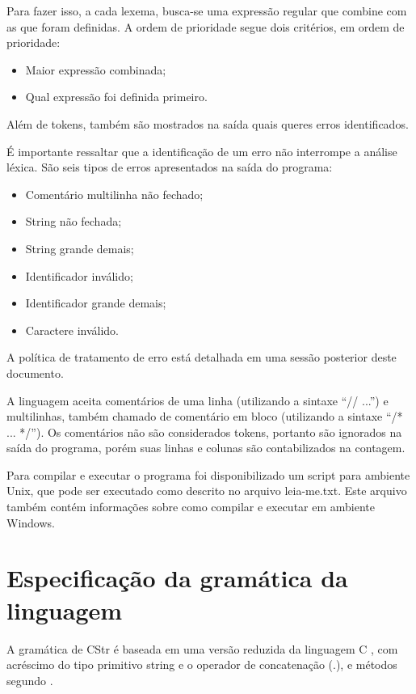 \documentclass[12pt]{article}
\begin{document}
Para fazer isso, a cada lexema, busca-se uma expressão regular que combine com as que foram definidas. A ordem de prioridade segue dois critérios, em ordem de prioridade:
\begin{itemize}
	\item Maior expressão combinada;
	\item Qual expressão foi definida primeiro.\\
\end{itemize}

Além de tokens, também são mostrados na saída quais queres erros identificados.

É importante ressaltar que a identificação de um erro não interrompe a análise léxica. São seis tipos de erros apresentados na saída do programa: 
\begin{itemize}
	\item Comentário multilinha não fechado;
	\item String não fechada;
	\item String grande demais;
	\item Identificador inválido;
	\item Identificador grande demais;
	\item Caractere inválido.\\
\end{itemize}

A política de tratamento de erro está detalhada em uma sessão posterior deste documento.

A linguagem aceita comentários de uma linha (utilizando a sintaxe ``// ...'') e multilinhas, também chamado de comentário em bloco (utilizando a sintaxe ``/* ... */''). Os comentários não são considerados tokens, portanto são ignorados na saída do programa, porém suas linhas e colunas são contabilizados na contagem.

Para compilar e executar o programa foi disponibilizado um script para ambiente Unix, que pode ser executado como descrito no arquivo leia-me.txt. Este arquivo também contém informações sobre como compilar e executar em ambiente Windows.


\section{Especificação da gramática da linguagem}

\indent
A gramática de CStr é baseada em uma versão reduzida da linguagem C \cite{minic}, com acréscimo do tipo primitivo string e o operador de concatenação (.), e métodos segundo \cite{cplusplus}.
\end{document}
